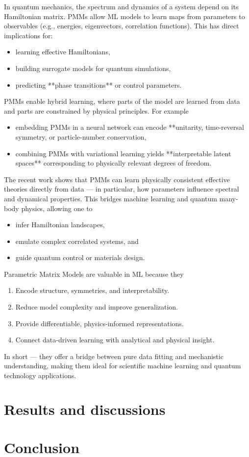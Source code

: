 \documentclass[twocolumn,superscriptaddress,unsortedaddress,nofootinbib,amsmath,amssymb,
aps,floatfix]{revtex4-2}
\begin{document}
In quantum mechanics, the spectrum and dynamics of a system depend on
its Hamiltonian matrix. PMMs allow ML models to learn maps from
parameters to observables (e.g., energies, eigenvectors, correlation
functions). This has direct implications for:
\begin{itemize}
\item learning effective Hamiltonians,
\item building surrogate models for quantum simulations,
\item predicting **phase transitions** or control parameters.
\end{itemize}

PMMs enable hybrid learning, where parts of the model are learned from
data and parts are constrained by physical principles. For example
\begin{itemize}
\item embedding PMMs in a neural network can encode **unitarity, time-reversal symmetry, or particle-number conservation,
\item combining PMMs with variational learning yields **interpretable latent spaces** corresponding to physically relevant degrees of freedom.
\end{itemize}

The recent work \cite{pmm2025} shows that PMMs can learn physically
consistent effective theories directly from data — in particular, how
parameters influence spectral and dynamical properties.  This bridges
machine learning and quantum many-body physics, allowing one to
\begin{itemize}
\item  infer Hamiltonian landscapes,
\item emulate complex correlated systems, and
\item  guide quantum control or materials design.
\end{itemize}

Parametric Matrix Models are valuable in ML because they
\begin{enumerate}
\item Encode structure, symmetries, and interpretability.
\item Reduce model complexity and improve generalization.
\item Provide differentiable, physics-informed representations.
\item Connect data-driven learning with analytical and physical insight.
\end{enumerate}

In short — they offer a bridge between pure data fitting and
mechanistic understanding, making them ideal for scientific machine
learning and quantum technology applications.

\section{Results and discussions}


\section{Conclusion}

%
\end{document}
